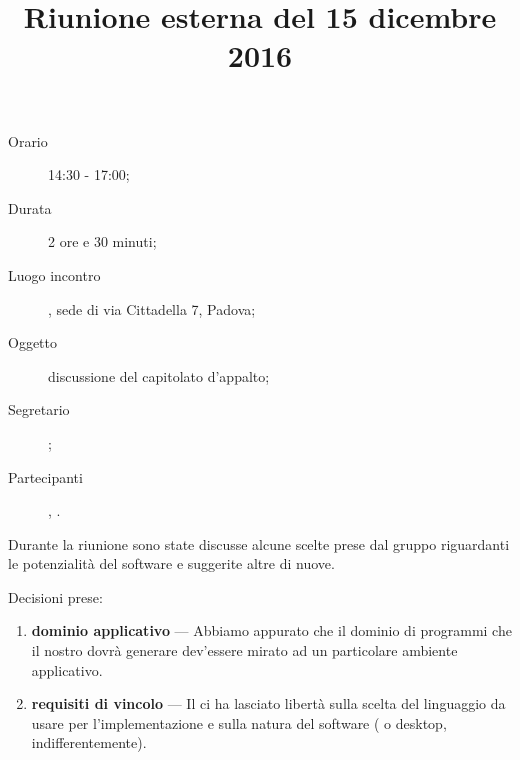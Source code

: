 


\author{\PB}
\supervisor{\MM}
\dest{\ALL}
\title{Riunione esterna del 15 dicembre 2016}



\maketitle

\begin{description}
	\item[Orario] 14:30 - 17:00;
	\item[Durata] 2 ore e 30 minuti;
	\item[Luogo incontro] \ZU, sede di via Cittadella 7, Padova;
	\item[Oggetto] discussione del capitolato d'appalto;
	\item[Segretario] \LS; 
	\item[Partecipanti] \GP, \ALL.
\end{description}

Durante la riunione sono state discusse alcune scelte prese dal gruppo riguardanti le potenzialità del software e suggerite altre di nuove.

Decisioni prese:
\begin{enumerate}
	\item \textbf{dominio applicativo} --- Abbiamo appurato che il dominio di programmi che il nostro  dovrà generare dev'essere mirato ad un particolare ambiente applicativo.
	\item \textbf{requisiti di vincolo} --- Il \GP ci ha lasciato libertà sulla scelta del linguaggio da usare per l'implementazione e sulla natura del software ( o desktop, indifferentemente).
\end{enumerate}


